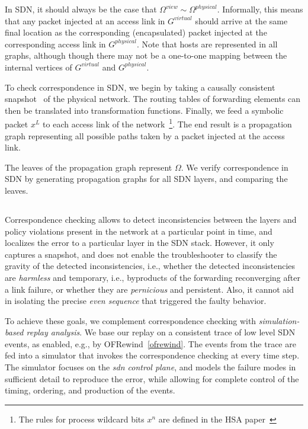 In SDN, it should always be the case that 
$\Omega^{view} \sim \Omega^{physical}$. Informally, this means that
any packet injected at an access link in $G^{virtual}$ should arrive at
the same final location as the corresponding (encapsulated) packet injected at the
corresponding access link in $G^{physical}$. Note that hosts are represented
in all graphs, although though there may not be a one-to-one mapping between the
internal vertices of $G^{virtual}$ and $G^{physical}$.

To check correspondence in SDN, we begin by taking a causally consistent
snapshot~\cite{Chandy:1985:DSD:214451.214456} of the physical network. The routing
tables of forwarding elements can then be translated into transformation functions.
Finally, we feed a symbolic packet $x^L$ to each access link of the
network~\footnote{The rules for process wildcard bits $x^n$ are defined in
the HSA paper~\cite{hsa}}. The end result is a propagation graph representing all possible paths taken by a packet injected
at the access link.

The leaves of the propagation graph represent $\Omega$. We
verify correspondence in SDN by generating propagation graphs for all SDN layers,
and comparing the leaves.

\subsection{\SIMULATOR{}}

Correspondence checking allows to detect inconsistencies between the layers and
policy violations present in the network at a particular point in time, and
localizes the error to a particular layer in the SDN stack. However, it only
captures a snapshot, and does not enable the troubleshooter to classify the
gravity of the detected inconsistencies, i.e., whether the detected 
inconsistencies are \emph{harmless} and temporary, i.e., byproducts of the forwarding reconverging 
after a link failure, or whether they are \emph{pernicious} and persistent.
Also, it cannot aid in isolating the precise \emph{even sequence} that triggered
the faulty behavior.

To achieve these goals, we complement correspondence checking with
\emph{simulation-based replay analysis}. We base our replay on a consistent
trace of low level SDN events, as enabled, e.g., by OFRewind~\ref{ofrewind}. The
events from the trace are fed into a simulator that invokes the correspondence
checking at every time step. The simulator focuses on the \emph{sdn control plane},
and models the failure modes in sufficient detail to reproduce the error, while
allowing for complete control of the timing, ordering, and production of the events.

